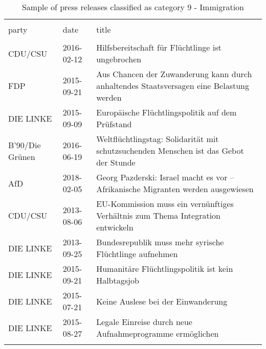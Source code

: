 
\begin{table}[!htbp] \centering 
  \caption{Sample of press releases classified as category 9 - Immigration} 
  \label{tab:7-document-samples} 
\begin{tabularx}{\textwidth}{stX} 
\\[-1.8ex]\hline 
\hline \\[-1.8ex] 
party & date & title \\ 
\hline \\[-1.8ex] 
CDU/CSU & 2016-02-12 & Hilfsbereitschaft für Flüchtlinge ist ungebrochen \\ 
FDP & 2015-09-21 & Aus Chancen der Zuwanderung kann durch anhaltendes Staatsversagen eine Belastung werden \\ 
DIE LINKE & 2015-09-09 & Europäische Flüchtlingspolitik auf dem Prüfstand \\ 
B'90/Die Grünen & 2016-06-19 & Weltflüchtlingstag: Solidarität mit schutzsuchenden Menschen ist das Gebot der Stunde \\ 
AfD & 2018-02-05 & Georg Pazderski: Israel macht es vor – Afrikanische Migranten werden ausgewiesen \\ 
CDU/CSU & 2013-08-06 & EU-Kommission muss ein vernünftiges Verhältnis zum Thema Integration entwickeln \\ 
DIE LINKE & 2013-09-25 & Bundesrepublik muss mehr syrische Flüchtlinge aufnehmen \\ 
DIE LINKE & 2015-09-21 & Humanitäre Flüchtlingspolitik ist kein Halbtagsjob \\ 
DIE LINKE & 2015-07-21 & Keine Auslese bei der Einwanderung \\ 
DIE LINKE & 2015-08-27 & Legale Einreise durch neue Aufnahmeprogramme ermöglichen \\ 
\hline \\[-1.8ex] 
\end{tabularx} 
\end{table} 
